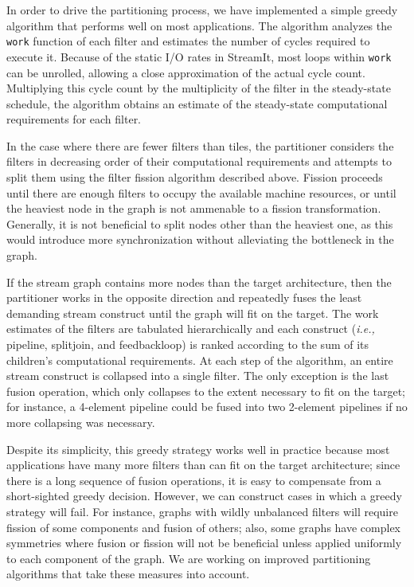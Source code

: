 In order to drive the partitioning process, we have implemented a
simple greedy algorithm that performs well on most applications.  The
algorithm analyzes the {\tt work} function of each filter and
estimates the number of cycles required to execute it.  Because of the
static I/O rates in StreamIt, most loops within {\tt work} can be
unrolled, allowing a close approximation of the actual cycle count.
Multiplying this cycle count by the multiplicity of the filter in the
steady-state schedule, the algorithm obtains an estimate of the
steady-state computational requirements for each filter.

In the case where there are fewer filters than tiles, the partitioner
considers the filters in decreasing order of their computational
requirements and attempts to split them using the filter fission
algorithm described above.  Fission proceeds until there are enough
filters to occupy the available machine resources, or until the
heaviest node in the graph is not ammenable to a fission
transformation.  Generally, it is not beneficial to split nodes other
than the heaviest one, as this would introduce more synchronization
without alleviating the bottleneck in the graph.

If the stream graph contains more nodes than the target architecture,
then the partitioner works in the opposite direction and repeatedly
fuses the least demanding stream construct until the graph will fit on
the target.  The work estimates of the filters are tabulated
hierarchically and each construct ({\it i.e.,} pipeline, splitjoin,
and feedbackloop) is ranked according to the sum of its children's
computational requirements.  At each step of the algorithm, an entire
stream construct is collapsed into a single filter.  The only
exception is the last fusion operation, which only collapses to the
extent necessary to fit on the target; for instance, a 4-element
pipeline could be fused into two 2-element pipelines if no more
collapsing was necessary.

Despite its simplicity, this greedy strategy works well in practice
because most applications have many more filters than can fit on the
target architecture; since there is a long sequence of fusion
operations, it is easy to compensate from a short-sighted greedy
decision.  However, we can construct cases in which a greedy strategy
will fail.  For instance, graphs with wildly unbalanced filters will
require fission of some components and fusion of others; also, some
graphs have complex symmetries where fusion or fission will not be
beneficial unless applied uniformly to each component of the graph.
We are working on improved partitioning algorithms that take these
measures into account.

